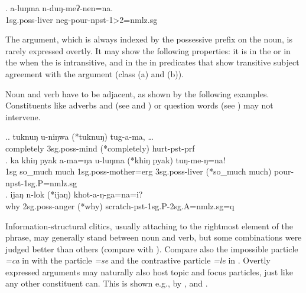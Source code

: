 \exg. a-luŋma n-duŋ-meʔ-nen=na.\\
		{\sc 1sg.poss}-liver {\sc neg-}pour{\sc -npst-1>2=nmlz.sg}\\


The  argument, which is always indexed by the possessive prefix on the noun, is rarely expressed overtly. It may show the following properties: it is in the  or in the  when the  is intransitive, and in the  in predicates that show transitive subject agreement with the  argument (class (a) and (b)). 

Noun and verb have to be adjacent, as shown by the following examples. Constituents like  adverbs and   (see \Next[a] and \Next[b]) or question words (see \Next[c]) may not intervene. 

\ex.\ag. tuknuŋ u-niŋwa (*tuknuŋ) tug-a-ma, {\hspace{-.4cm}\ob\dots\cb}\\
 completely {\sc 3sg.poss}-mind  (*completely) hurt{\sc [3sg]-pst-prf}\\
  
 \bg. ka khiŋ pyak a-ma=ŋa u-luŋma  (*khiŋ pyak) tuŋ-me-ŋ=na!\\
 {\sc 1sg} so\_much much {\sc 1sg.poss-}mother{\sc =erg} {\sc 3sg.poss-}liver (*so\_much much) pour{\sc [ 3sg.A]-npst-1sg.P=nmlz.sg}\\
 \bg. ijaŋ n-lok (*ijaŋ) khot-a-ŋ-ga=na=i?\\
 why	{\sc 2sg.poss}-anger (*why) scratch{\sc -pst-1sg.P-2sg.A=nmlz.sg=q}\\


Information-structural clitics, usually attaching to the rightmost element of the phrase, may generally stand between noun and verb, 
but some combinations were judged better than others (compare \Next[a] with \Next[b]). Compare also the impossible  particle \emph{=ca} in \Next[a] with the  particle \emph{=se} and the contrastive particle \emph{=le} in \NNext. Overtly expressed  arguments  may naturally also host topic and focus particles, just like any other constituent can. This is shown e.g., by \Next[b], \NNext[c] and \NNext[d].


